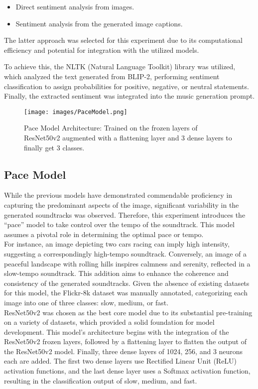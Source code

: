 \documentclass[conference]{IEEEtran}
\begin{document}
\begin{itemize}
    \item Direct sentiment analysis from images.
    \item Sentiment analysis from the generated image captions.
\end{itemize}

The latter approach was selected for this experiment due to its computational efficiency and potential for integration with the utilized models.

To achieve this, the NLTK (Natural Language Toolkit) library was utilized, which analyzed the text generated from BLIP-2, performing sentiment classification to assign probabilities for positive, negative, or neutral statements. Finally, the extracted sentiment was integrated into the music generation prompt.

\begin{figure}[ht]
    \centering
    \texttt{[image: images/PaceModel.png]}
    \caption{Pace Model Architecture: Trained on the frozen layers of ResNet50v2 augmented with a flattening layer and 3 dense layers to finally get 3 classes.}
    \label{fig:pace-model}
\end{figure}

\subsection{Pace Model}

While the previous models have demonstrated commendable proficiency in capturing the predominant aspects of the image, significant variability in the generated soundtracks was observed. Therefore, this experiment introduces the ``pace'' model to take control over the tempo of the soundtrack. This model assumes a pivotal role in determining the optimal pace or tempo.
\\

For instance, an image depicting two cars racing can imply high intensity, suggesting a correspondingly high-tempo soundtrack. Conversely, an image of a peaceful landscape with rolling hills inspires calmness and serenity, reflected in a slow-tempo soundtrack. This addition aims to enhance the coherence and consistency of the generated soundtracks. Given the absence of existing datasets for this model, the Flickr-8k dataset was manually annotated, categorizing each image into one of three classes: slow, medium, or fast.
\\

ResNet50v2 was chosen as the best core model due to its substantial pre-training on a variety of datasets, which provided a solid foundation for model development.
This model's architecture begins with the integration of the ResNet50v2 frozen layers, followed by a flattening layer to flatten the output of the ResNet50v2 model.
Finally, three dense layers of 1024, 256, and 3 neurons each are added. The first two dense layers use Rectified Linear Unit (ReLU) activation functions, and the last dense layer uses a Softmax activation function, resulting in the classification output of slow, medium, and fast.
\\
\end{document}
